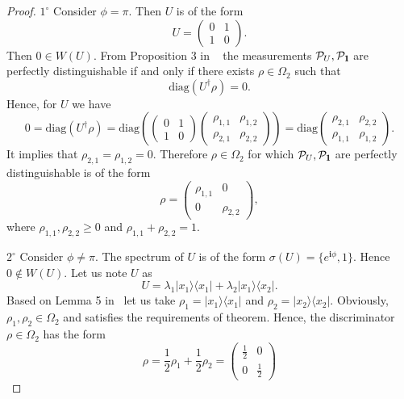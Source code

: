 \documentclass[preprint,12pt, a4paper]{elsarticle}
\newcommand{\ket}[1]{\ensuremath{|#1\rangle}}
\newcommand{\bra}[1]{\ensuremath{\langle#1|}}
\newcommand{\ketbra}[2]{\ensuremath{\ket{#1}\bra{#2}}}
\newcommand{\1}{{\rm 1\hspace{-0.9mm}l}}
\begin{document}
\begin{proof}
	$1^\circ$ Consider $\phi = \pi$. Then $U$ is of the form
	\begin{equation}
	U = \left(\begin{array}{cc}0&1\\1&0\end{array}\right).
	\end{equation}
Then $0 \in W(U)$. 	From Proposition 3 in ~\cite{puchala2018strategies} the measurements $\mathcal{P}_U, \mathcal{P}_\1$ are perfectly distinguishable if and only if there exists $\rho \in \Omega_2$ such that
	\begin{equation}
	\mathrm{diag}\left(U^\dagger \rho\right) = 0.
	\end{equation}
Hence, for $U $ we have 
	\begin{equation}
	0 = \mathrm{diag}\left(U^\dagger \rho\right) = \mathrm{diag} \left(\left(\begin{array}{cc}0&1\\1&0\end{array}\right)\left(\begin{array}{cc}\rho_{1,1}&\rho_{1,2}\\\rho_{2,1}&\rho_{2,2}\end{array}\right)\right) =  \mathrm{diag} \left(\begin{array}{cc}\rho_{2,1}&\rho_{2,2}\\\rho_{1,1}&\rho_{1,2}\end{array}\right).
	\end{equation}
 It implies that $\rho_{2,1}=\rho_{1,2} = 0$. Therefore $\rho \in \Omega_2$ for which $\mathcal{P}_U, \mathcal{P}_\1$  are perfectly distinguishable is of the form
	\begin{equation}
	\rho = \left(\begin{array}{cc}\rho_{1,1}&0\\0&\rho_{2,2}\end{array}\right),
	\end{equation}
	where $\rho_{1,1},\rho_{2,2} \ge 0$ and  $\rho_{1,1}+\rho_{2,2}=1$.

	$2^\circ$ Consider  $\phi \not = \pi$. 
The spectrum of $U$ is of the form $\sigma(U) = \{e^{\mathbf{i} \phi},1\}$. Hence $0 \not\in W\left(U\right)$.  Let us note $U$ as 
	\begin{equation}
	U= \lambda_1 \ketbra{x_1}{x_1} + \lambda_2 \ketbra{x_1}{x_2}.
	\end{equation}
Based on Lemma 5 in~\cite{puchala2018strategies} let us take $\rho_1 = \ketbra{x_1}{x_1}$ and $\rho_2 = \ketbra{x_2}{x_2}$. Obviously,  $\rho_1,\rho_2 \in \Omega_2$ and satisfies the requirements of theorem. Hence, the discriminator $\rho \in \Omega_2$ has the form 
	\begin{equation}
	\rho = \frac{1}{2} \rho_1 + \frac{1}{2}\rho_2 = \left(\begin{array}{cc}\frac{1}{2}&0\\0&\frac{1}{2}\end{array}\right)
	\end{equation}


\end{proof}
\end{document}
